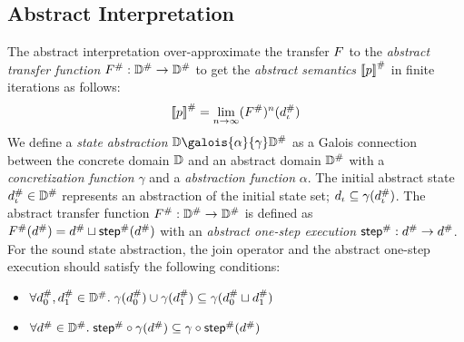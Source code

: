 \subsection{Abstract Interpretation}
The abstract interpretation over-approximate the transfer $F$ to the
\textit{abstract transfer function} ${F}^{\#}: {\mathbb{D}}^{\#} \rightarrow {\mathbb{D}}^{\#}$
to get the \textit{abstract semantics} ${[\![{p}]\!]}^{\#}$ in finite iterations as
follows:
\[
    {[\![{p}]\!]}^{\#} = \underset{n \rightarrow
    \infty}{\lim}{({F}^{\#})^n({d}^{\#}_\iota)}\\
\]
We define a \textit{state abstraction} $\dom \galois{\alpha}{\gamma} \absdom$ as
a Galois connection between the concrete domain $\mathbb{D}$ and an abstract domain
${\mathbb{D}}^{\#}$ with a \textit{concretization function} $\gamma$ and a
\textit{abstraction function} $\alpha$.  The initial abstract state ${d}^{\#}_\iota
\in {\mathbb{D}}^{\#}$ represents an abstraction of the initial state set; $d_\iota
\subseteq \gamma({d}^{\#}_\iota)$.  The abstract transfer function ${F}^{\#}:
{\mathbb{D}}^{\#} \rightarrow {\mathbb{D}}^{\#}$ is defined as ${F}^{\#}({d}^{\#}) = {d}^{\#}
\sqcup {\textsf{step}}^{\#}({d}^{\#})$ with an \textit{abstract one-step execution}
${\textsf{step}}^{\#}: {d}^{\#} \rightarrow {d}^{\#}$.  For the sound state abstraction, the
join operator and the abstract one-step execution should satisfy the following
conditions:
\begin{itemize}
  \item $\forall {d}^{\#}_0, {d}^{\#}_1 \in {\mathbb{D}}^{\#}. \; \gamma({d}^{\#}_0) \cup
    \gamma({d}^{\#}_1) \subseteq \gamma({d}^{\#}_0 \sqcup {d}^{\#}_1)$
  \item $\forall {d}^{\#} \in {\mathbb{D}}^{\#}. \; {\textsf{step}}^{\#} \circ \gamma({d}^{\#}) \subseteq
    \gamma \circ {\textsf{step}}^{\#}({d}^{\#})$
\end{itemize}
